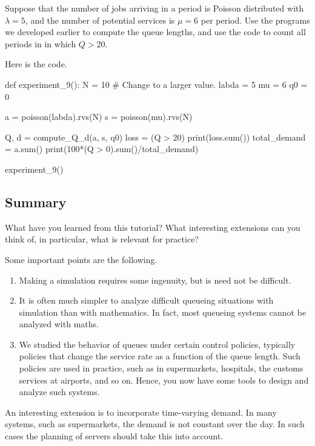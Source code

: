 \begin{exercise}
  Suppose that the number of jobs arriving in a period is Poisson distributed with $\lambda=5$, and the number of potential services is $\mu=6$ per period.
  Use the programs we developed earlier to compute the queue lengths, and use the code  to count all periods in in which $Q>20$.

  \begin{solution}
Here is the code.
\begin{pyverbatim}
def experiment_9():
    N = 10 # Change to a larger value.
    labda = 5
    mu = 6
    q0 = 0

    a = poisson(labda).rvs(N)
    s = poisson(mu).rvs(N)

    Q, d = compute_Q_d(a, s, q0)
    loss = (Q > 20)
    print(loss.sum())
    total_demand = a.sum() 
    print(100*(Q > 0).sum()/total_demand)


experiment_9()
\end{pyverbatim}
    
  \end{solution}

\end{exercise}

\subsection{Summary}
\label{sec:summary}

\begin{exercise}
  What have you learned from this tutorial? What interesting extensions can you think of, in particular, what is relevant for practice? 
\begin{solution}
    Some important points are the following.
    \begin{enumerate}
    \item Making a simulation requires some ingenuity, but is need not be difficult.
    \item It is often much simpler to analyze difficult queueing situations with simulation than with mathematics.
      In fact, most queueing systems cannot be analyzed with maths.
    \item We studied the behavior of queues under certain control policies, typically policies that change the service rate as a function of the queue length. Such policies are used in practice, such as in supermarkets, hospitals, the customs services at airports, and so on. Hence, you now have some tools to design and analyze such systems.
    \end{enumerate}

An interesting extension is to incorporate time-varying demand. In many systems, such as supermarkets, the demand is not constant over the day. In such cases the planning of servers should take this into account.

  \end{solution}
\end{exercise}

  
